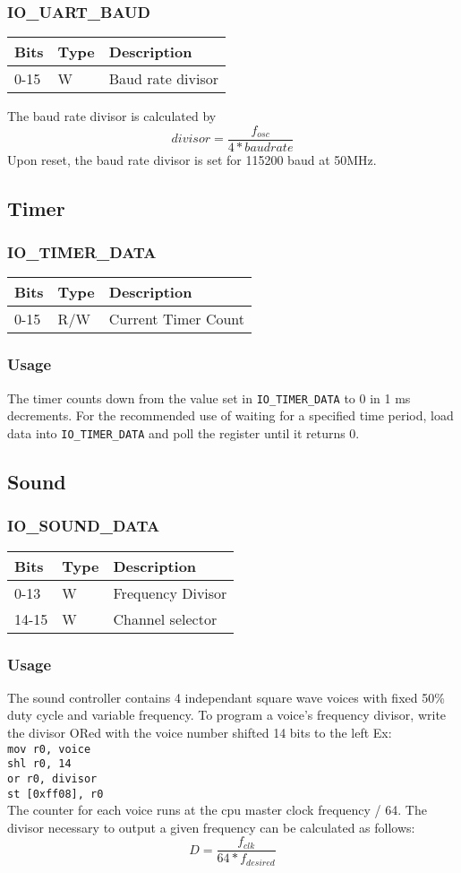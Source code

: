 \documentclass{article}
\newcommand{\regdesc}[2]{
  \subsubsection{#1}
  \begin{tabular}{|l|l|l|}
    \hline
    Bits & Type & Description \\ \hline
    #2
  \end{tabular}
}
\begin{document}
        \regdesc{IO\_UART\_BAUD}{
        0-15 & W & Baud rate divisor \\ \hline
        }
        The baud rate divisor is calculated by
        \begin{equation}
          divisor=\frac{f_{osc}}{4*baudrate}
        \end{equation}
        Upon reset, the baud rate divisor is set for 115200 baud at
        50MHz.
        
        \subsection{Timer}
        \regdesc{IO\_TIMER\_DATA}{
          0-15 & R/W & Current Timer Count \\ \hline
        }
        \subsubsection{Usage}
        The timer counts down from the value set in \texttt{IO\_TIMER\_DATA} to
        0 in 1 ms decrements.  For the recommended use of waiting for a
        specified time period, load data into \texttt{IO\_TIMER\_DATA} and poll
        the register until it returns 0.
        \subsection{Sound}
        \regdesc{IO\_SOUND\_DATA}{
          0-13 & W & Frequency Divisor \\ \hline
          14-15 & W & Channel selector \\ \hline
        }
        \subsubsection{Usage}
        The sound controller contains 4 independant square wave voices with fixed 50\% duty
        cycle and variable frequency. To program a voice's frequency divisor,
        write the divisor ORed with the voice number shifted 14 bits to the left
        Ex: \\ \texttt{mov r0, voice\\ shl r0, 14 \\ or r0, divisor \\ st
          [0xff08], r0} \\
        The counter for each voice runs at the cpu master clock frequency /
        64. The divisor necessary to output a given frequency can be calculated
        as follows: $$D=\frac{f_{clk}}{64*f_{desired}}$$
\end{document}
